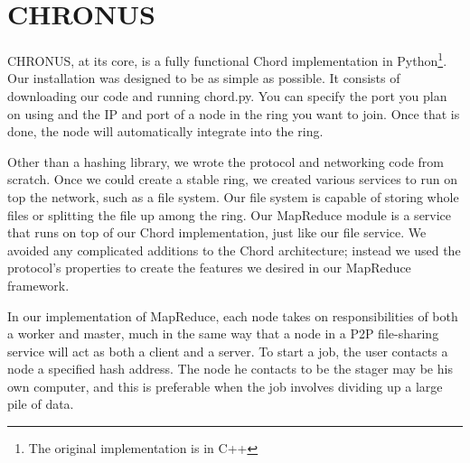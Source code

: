 \documentclass[conference, compsocconf, letterpaper]{IEEEtran}
\begin{document}




\section{CHRONUS}

CHRONUS, at its core, is a fully functional Chord implementation in Python\footnote{The original implementation is in C++}.  Our installation was designed to be as simple as possible.   It consists of downloading our code\cite{code} and running chord.py.  You can specify the port you plan on using and the IP and port of a node in the ring you want to join.  Once that is done, the node will automatically integrate into the ring.

Other than a hashing library, we wrote the protocol and networking code from scratch.  Once we could create a stable ring, we created various services to run on top the network, such as a file system.  Our file system is capable of storing whole files or splitting the file up among the ring. Our MapReduce module is a service that runs on top of our Chord implementation, just like our file service.    We avoided any complicated additions to the Chord architecture; instead we used the protocol's properties to create the features we desired in our MapReduce framework. 
  
In our implementation of MapReduce, each node takes on responsibilities of both a worker and master, much in the same way that a node in a P2P file-sharing service will act as both a client and a server.  To start a job, the user contacts a node a specified hash address. The node he contacts to be the stager may be his own computer, and this is preferable when the job involves dividing up a large pile of data. 
\end{document}
